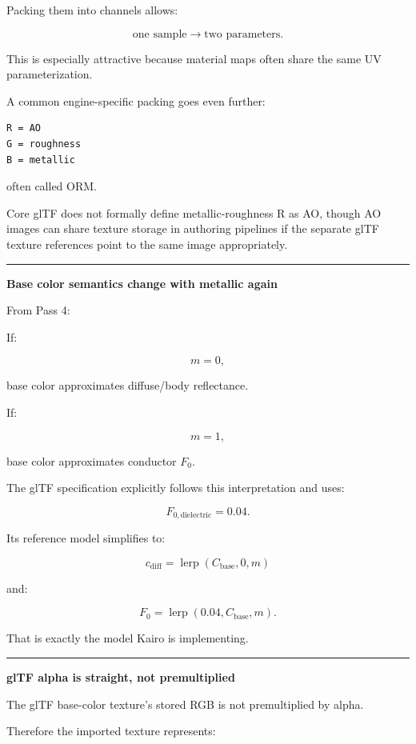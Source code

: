 Packing them into channels allows:

\[
\text{one sample}
\rightarrow
\text{two parameters}.
\]

This is especially attractive because material maps often share the same UV parameterization.

A common engine-specific packing goes even further:

\begin{verbatim}
R = AO
G = roughness
B = metallic
\end{verbatim}

often called ORM.

Core glTF does not formally define metallic-roughness R as AO, though AO images can share texture storage in authoring pipelines if the separate glTF texture references point to the same image appropriately.

\begin{center}\rule{0.5\linewidth}{0.5pt}\end{center}

\textbf{Base color semantics change with metallic again}

From Pass 4:

If:

\[
m=0,
\]

base color approximates diffuse/body reflectance.

If:

\[
m=1,
\]

base color approximates conductor \(F_0\).

The glTF specification explicitly follows this interpretation and uses:

\[
F_{0,\text{dielectric}}=0.04.
\]

Its reference model simplifies to:

\[
c_{\text{diff}}
=
\operatorname{lerp}(C_{\text{base}},0,m)
\]

and:

\[
F_0=
\operatorname{lerp}(0.04,C_{\text{base}},m).
\]

That is exactly the model Kairo is implementing.

\begin{center}\rule{0.5\linewidth}{0.5pt}\end{center}

\textbf{glTF alpha is straight, not premultiplied}

The glTF base-color texture's stored RGB is not premultiplied by alpha.

Therefore the imported texture represents:

